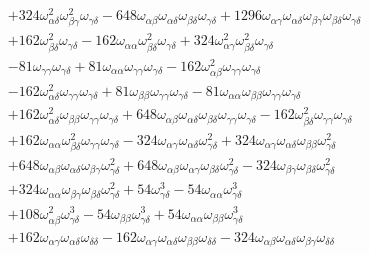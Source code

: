 \begin{equation*}
\begin{split}
    & + 324\omega_{\alpha\delta}^2\omega_{\beta\gamma}^2\omega_{\gamma\delta} - 648\omega_{\alpha\beta}\omega_{\alpha\delta}\omega_{\beta\delta}\omega_{\gamma\delta} + 1296\omega_{\alpha\gamma}\omega_{\alpha\delta}\omega_{\beta\gamma}\omega_{\beta\delta}\omega_{\gamma\delta} \\
    & + 162\omega_{\beta\delta}^2\omega_{\gamma\delta} - 162\omega_{\alpha\alpha}\omega_{\beta\delta}^2\omega_{\gamma\delta} + 324\omega_{\alpha\gamma}^2\omega_{\beta\delta}^2\omega_{\gamma\delta} \\
    & - 81\omega_{\gamma\gamma}\omega_{\gamma\delta} + 81\omega_{\alpha\alpha}\omega_{\gamma\gamma}\omega_{\gamma\delta} - 162\omega_{\alpha\beta}^2\omega_{\gamma\gamma}\omega_{\gamma\delta} \\
    & - 162\omega_{\alpha\delta}^2\omega_{\gamma\gamma}\omega_{\gamma\delta} + 81\omega_{\beta\beta}\omega_{\gamma\gamma}\omega_{\gamma\delta} - 81\omega_{\alpha\alpha}\omega_{\beta\beta}\omega_{\gamma\gamma}\omega_{\gamma\delta} \\
    & + 162\omega_{\alpha\delta}^2\omega_{\beta\beta}\omega_{\gamma\gamma}\omega_{\gamma\delta} + 648\omega_{\alpha\beta}\omega_{\alpha\delta}\omega_{\beta\delta}\omega_{\gamma\gamma}\omega_{\gamma\delta} - 162\omega_{\beta\delta}^2\omega_{\gamma\gamma}\omega_{\gamma\delta} \\
    & + 162\omega_{\alpha\alpha}\omega_{\beta\delta}^2\omega_{\gamma\gamma}\omega_{\gamma\delta} - 324\omega_{\alpha\gamma}\omega_{\alpha\delta}\omega_{\gamma\delta}^2 + 324\omega_{\alpha\gamma}\omega_{\alpha\delta}\omega_{\beta\beta}\omega_{\gamma\delta}^2 \\
    & + 648\omega_{\alpha\beta}\omega_{\alpha\delta}\omega_{\beta\gamma}\omega_{\gamma\delta}^2 + 648\omega_{\alpha\beta}\omega_{\alpha\gamma}\omega_{\beta\delta}\omega_{\gamma\delta}^2 - 324\omega_{\beta\gamma}\omega_{\beta\delta}\omega_{\gamma\delta}^2 \\
    & + 324\omega_{\alpha\alpha}\omega_{\beta\gamma}\omega_{\beta\delta}\omega_{\gamma\delta}^2 + 54\omega_{\gamma\delta}^3 - 54\omega_{\alpha\alpha}\omega_{\gamma\delta}^3 \\
    & + 108\omega_{\alpha\beta}^2\omega_{\gamma\delta}^3 - 54\omega_{\beta\beta}\omega_{\gamma\delta}^3 + 54\omega_{\alpha\alpha}\omega_{\beta\beta}\omega_{\gamma\delta}^3 \\
    & + 162\omega_{\alpha\gamma}\omega_{\alpha\delta}\omega_{\delta\delta} - 162\omega_{\alpha\gamma}\omega_{\alpha\delta}\omega_{\beta\beta}\omega_{\delta\delta} - 324\omega_{\alpha\beta}\omega_{\alpha\delta}\omega_{\beta\gamma}\omega_{\delta\delta} \\

\end{split}
\end{equation*}
